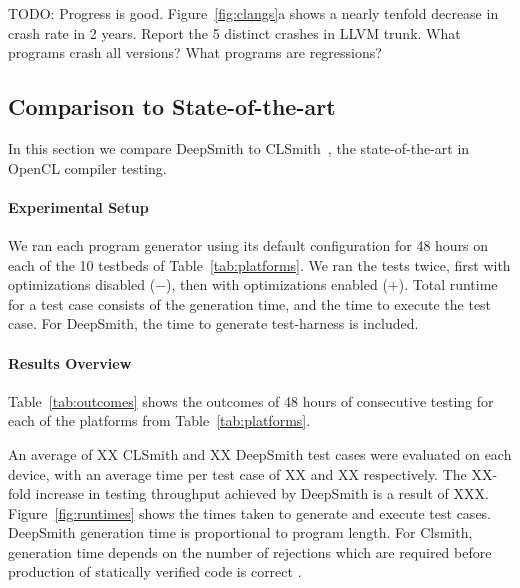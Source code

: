 TODO: Progress is good. Figure~\ref{fig:clangs}a shows a nearly tenfold decrease in crash rate in 2 years. Report the 5 distinct crashes in LLVM trunk. What programs crash all versions? What programs are regressions?


\subsection{Comparison to State-of-the-art}%
\label{subsec:vs_clsmith}

In this section we compare DeepSmith to CLSmith~\cite{Lidbury2015a}, the state-of-the-art in OpenCL compiler testing.

\paragraph{Experimental Setup}

We ran each program generator using its default configuration for 48 hours on each of the 10 testbeds of Table~\ref{tab:platforms}. We ran the tests twice, first with optimizations disabled ($-$), then with optimizations enabled ($+$). Total runtime for a test case consists of the generation time, and the time to execute the test case. For DeepSmith, the time to generate test-harness is included.


\paragraph{Results Overview}

\begin{table}
  \scriptsize %
  \centering %
  
  \caption{%
    Results from 48 hours of testing using CLSmith and DeepSmith. Testbed \#. as per Table~\ref{tab:platforms}. $\pm$ denotes optimizations off ($-$) vs on ($+$). The remaining columns denote build failure (\textbf{bf}), build crash (\textbf{bc}), build timeout (\textbf{bto}), runtime crash (\textbf{c}), timeout (\textbf{to}), and passed (\textbf{\cmark}) outcomes for CLSmith and DeepSmith, respectively.%
  }
  \label{tab:outcomes}
\end{table}

Table~\ref{tab:outcomes} shows the outcomes of 48 hours of consecutive testing for each of the platforms from Table~\ref{tab:platforms}.

An average of XX CLSmith and XX DeepSmith test cases were evaluated on each device, with an average time per test case of XX and XX respectively. The XX-fold increase in testing throughput achieved by DeepSmith is a result of XXX. Figure~\ref{fig:runtimes} shows the times taken to generate and execute test cases. DeepSmith generation time is proportional to program length. For Clsmith, generation time depends on the number of rejections which are required before production of statically verified code is correct .

